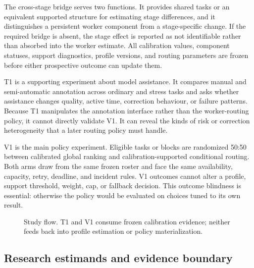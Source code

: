 The cross-stage bridge serves two functions. It provides shared tasks or an equivalent supported structure for estimating stage differences, and it distinguishes a persistent worker component from a stage-specific change. If the required bridge is absent, the stage effect is reported as not identifiable rather than absorbed into the worker estimate. All calibration values, component statuses, support diagnostics, profile versions, and routing parameters are frozen before either prospective outcome can update them.

T1 is a supporting experiment about model assistance. It compares manual and semi-automatic annotation across ordinary and stress tasks and asks whether assistance changes quality, active time, correction behaviour, or failure patterns. Because T1 manipulates the annotation interface rather than the worker-routing policy, it cannot directly validate V1. It can reveal the kinds of risk or correction heterogeneity that a later routing policy must handle.

V1 is the main policy experiment. Eligible tasks or blocks are randomized 50:50 between calibrated global ranking and calibration-supported conditional routing. Both arms draw from the same frozen roster and face the same availability, capacity, retry, deadline, and incident rules. V1 outcomes cannot alter a profile, support threshold, weight, cap, or fallback decision. This outcome blindness is essential: otherwise the policy would be evaluated on choices tuned to its own result.

\begin{figure}[t]
\centering
{}
\caption{Study flow. T1 and V1 consume frozen calibration evidence; neither feeds back into profile estimation or policy materialization.}
\label{fig:studyflow}
\end{figure}

\subsection{Research estimands and evidence boundary}

